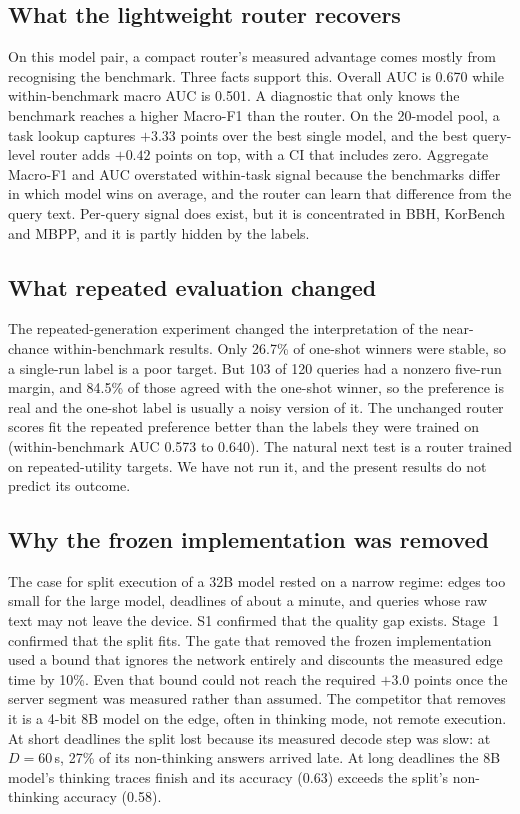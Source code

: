 \documentclass[lettersize,journal]{IEEEtran}
\begin{document}
\subsection{What the lightweight router recovers}
On this model pair, a compact router's measured advantage comes mostly from recognising the benchmark. Three facts support this. Overall AUC is 0.670 while within-benchmark macro AUC is 0.501. A diagnostic that only knows the benchmark reaches a higher Macro-F1 than the router. On the 20-model pool, a task lookup captures $+3.33$ points over the best single model, and the best query-level router adds $+0.42$ points on top, with a CI that includes zero. Aggregate Macro-F1 and AUC overstated within-task signal because the benchmarks differ in which model wins on average, and the router can learn that difference from the query text. Per-query signal does exist, but it is concentrated in BBH, KorBench and MBPP, and it is partly hidden by the labels.

\subsection{What repeated evaluation changed}
The repeated-generation experiment changed the interpretation of the near-chance within-benchmark results. Only 26.7\% of one-shot winners were stable, so a single-run label is a poor target. But 103 of 120 queries had a nonzero five-run margin, and 84.5\% of those agreed with the one-shot winner, so the preference is real and the one-shot label is usually a noisy version of it. The unchanged router scores fit the repeated preference better than the labels they were trained on (within-benchmark AUC 0.573 to 0.640). The natural next test is a router trained on repeated-utility targets. We have not run it, and the present results do not predict its outcome.

\subsection{Why the frozen implementation was removed}
The case for split execution of a 32B model rested on a narrow regime: edges too small for the large model, deadlines of about a minute, and queries whose raw text may not leave the device. S1 confirmed that the quality gap exists. Stage~1 confirmed that the split fits. The gate that removed the frozen implementation used a bound that ignores the network entirely and discounts the measured edge time by 10\%. Even that bound could not reach the required $+3.0$ points once the server segment was measured rather than assumed. The competitor that removes it is a 4-bit 8B model on the edge, often in thinking mode, not remote execution. At short deadlines the split lost because its measured decode step was slow: at $D=60$\,s, 27\% of its non-thinking answers arrived late. At long deadlines the 8B model's thinking traces finish and its accuracy (0.63) exceeds the split's non-thinking accuracy (0.58).
\end{document}
